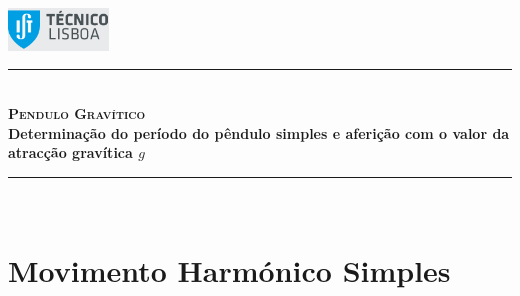 \documentclass[a4paper,twoside,12pt]{article}      %
\author{Prof. Bernardo B. Carvalho}
\date{ Setembro 2012}
\newcommand{\HRule}{\rule{\linewidth}{0.5mm}}
\begin{document}
 

\includegraphics[width=0.2\textwidth]{./logo-ist}%
	
	\HRule \\[0.5cm]
	{ \huge   \bfseries \textsc{ Pendulo Gravítico } }\\[0.4cm]
	{ \large \bfseries Determinação do período do pêndulo simples e aferição com o valor da atracção gravítica $g$  }\\
	\HRule \\%
	
%	 


\section{\sf Movimento Harmónico Simples}
\end{document}
